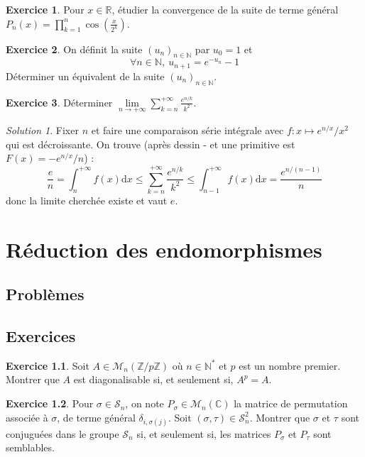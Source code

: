 \documentclass[french]{book}
\newcommand{\N}{\mathbb{N}}
\newcommand{\Z}{\mathbb{Z}}
\newcommand{\R}{\mathbb{R}}
\newcommand{\C}{\mathbb{C}}
\newcommand{\st}{^*}
\theoremstyle{definition}
\newtheorem{ex}{Exercice}[chapter]
\theoremstyle{remark}
\newtheorem*{sol}{Solution}
\begin{document}
\begin{ex}
	Pour $x\in\R$, étudier la convergence de la suite de terme général $P_n(x)=\displaystyle\prod_{k=1}^{n}\cos\left(\frac{x}{2^k}\right)$.
\end{ex}

\begin{ex}
	On définit la suite $(u_n)_{n\in\N}$ par $u_0=1$ et $$\forall n\in\N,\ u_{n+1}=e^{-u_n}-1$$ Déterminer un équivalent de la suite $(u_n)_{n\in\N}$.
\end{ex}

\begin{ex}
	Déterminer $\displaystyle\underset{n\to+\infty}{\lim}\sum_{k=n}^{+\infty}\frac{e^{n/k}}{k^2}$.
\end{ex}
\begin{sol}
	Fixer $n$ et faire une comparaison série intégrale avec $f:x\mapsto e^{n/x}/x^2$ qui est décroissante. On trouve (après dessin - et une primitive est $F(x)=-e^{n/x}/n$) :
	$$\frac{e}{n}=\int_{n}^{+\infty}f(x)\text{d} x\leqslant\sum_{k=n}^{+\infty}\frac{e^{n/k}}{k^2}\leqslant\int_{n-1}^{+\infty}f(x)\text{d} x=\frac{e^{n/(n-1)}}{n}$$ donc la limite cherchée existe et vaut $e$.
\end{sol}

\chapter{Réduction des endomorphismes}

\section{Problèmes}

\section{Exercices}

\begin{ex}
	Soit $A\in\mathcal{M}_n(\Z/p\Z)$ où $n\in\N\st$ et $p$ est un nombre premier. Montrer que $A$ est diagonalisable si, et seulement si, $A^p=A$.
\end{ex}

\begin{ex}
	Pour $\sigma\in\mathcal{S}_n$, on note $P_\sigma\in\mathcal{M}_n(\C)$ la matrice de permutation associée à $\sigma$, de terme général $\delta_{i,\sigma(j)}$. Soit $(\sigma,\tau)\in\mathcal{S}_n^2$. Montrer que $\sigma$ et $\tau$ sont conjuguées dans le groupe $\mathcal{S}_n$ si, et seulement si, les matrices $P_\sigma$ et $P_\tau$ sont semblables.
\end{ex}
\end{document}
